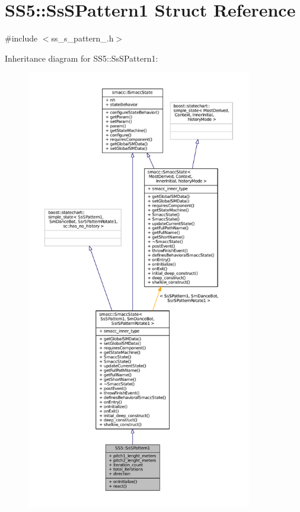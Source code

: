 \hypertarget{structSS5_1_1SsSPattern1}{}\section{S\+S5\+:\+:Ss\+S\+Pattern1 Struct Reference}
\label{structSS5_1_1SsSPattern1}


{\ttfamily \#include $<$ss\+\_\+s\+\_\+pattern\+\_.\+h$>$}



Inheritance diagram for S\+S5\+:\+:Ss\+S\+Pattern1\+:
\nopagebreak
\begin{figure}[H]
\begin{center}
\leavevmode
\includegraphics[height=550pt]{structSS5_1_1SsSPattern1__inherit__graph}
\end{center}
\end{figure}


